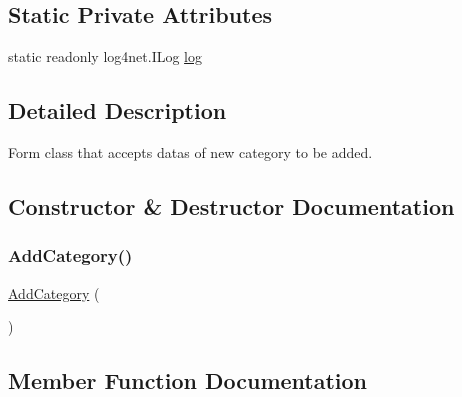 \subsection*{Static Private Attributes}
\begin{DoxyCompactItemize}
\item 
static readonly log4net.\+I\+Log \hyperlink{classWildlifeTrackingApp_1_1AddCategory_ae6c6142b8525b2f4ac6ee6e003b3106f}{log}
\end{DoxyCompactItemize}


\subsection{Detailed Description}
Form class that accepts datas of new category to be added. 



\subsection{Constructor \& Destructor Documentation}
\mbox{\label{classWildlifeTrackingApp_1_1AddCategory_af7eaf46f7b2758e1c6af7c0290322940}} 
\subsubsection{\texorpdfstring{Add\+Category()}{AddCategory()}}
{\footnotesize\ttfamily \hyperlink{classWildlifeTrackingApp_1_1AddCategory}{Add\+Category} (\begin{DoxyParamCaption}{ }\end{DoxyParamCaption})\hspace{0.3cm}{\ttfamily [inline]}}



\subsection{Member Function Documentation}
\mbox{\label{classWildlifeTrackingApp_1_1AddCategory_a849c3c7f8d08104f0cdb46bee9fe6389}} 
